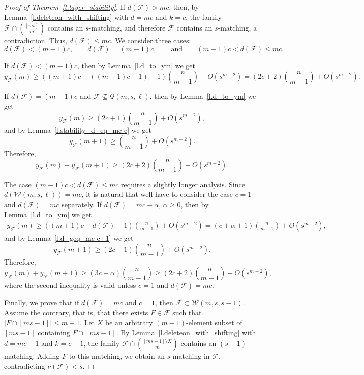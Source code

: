 \documentclass[12pt,a4paper]{article}
\newcommand{\m}{\mathcal}
\begin{document}
\begin{proof}[Proof of Theorem~\ref{t.layer_stability}]
If $d(\mathcal{F}) > mc$, then, by Lemma~\ref{l.deleteon_with_shifting} with $d=mc$ and $k=c$, the family $\mathcal{F} \cap {[ms] \choose m}$ contains an $s$-matching, and therefore $\mathcal{F}$ contains an $s$-matching, a contradiction. Thus, $d(\m F)\le mc.$ We consider three cases:
\[
d(\mathcal{F}) < (m-1)c,\qquad d(\mathcal{F}) = (m-1)c,\qquad \text{and} \qquad (m-1)c < d(\mathcal{F}) \leq mc.
\]

If $d(\mathcal{F}) < (m-1)c$, then by Lemma~\ref{l.d_to_ym} we get
\[
y_{\mathcal{F}}(m) \geq ((m+1)c-((m-1)c-1)+1){n \choose m - 1} + O(s^{m - 2}) = (2c+2){n \choose m - 1} + O(s^{m - 2}).
\]

If $d(\mathcal{F}) = (m-1)c$ and $\mathcal{F} \nsubseteq \mathcal{Q}(m,s,\ell)$, then by Lemma~\ref{l.d_to_ym} we get
\[
y_{\mathcal{F}}(m) \geq (2c+1){n \choose m - 1} + O(s^{m - 2}),
\]
and by Lemma~\ref{l.stability_d_eq_mc-c} we get
\[
y_{\mathcal{F}}(m+1) \geq {n \choose m - 1} + O(s^{m-2}).
\]
Therefore,
\[
y_{\mathcal{F}}(m) + y_{\mathcal{F}}(m + 1) \geq (2c+2){n \choose m - 1} + O(s^{m - 2}).
\]

The case $(m-1)c < d(\mathcal{F}) \leq mc$ requires a slightly longer analysis. Since $d(\mathcal{W}(m, s, \ell)) = mc$, it is natural that well have to consider  the case $c = 1$ and $d(\mathcal{F}) = mc$ separately. 
If $d(\mathcal{F}) = mc-\alpha$, $\alpha\ge 0$, then by Lemma~\ref{l.d_to_ym} we get
{\small \begin{align} \label{eq:tmp1}
    y_{\mathcal{F}}(m) \geq ((m+1)c-d(\m F)+1){n \choose m - 1} + O(s^{m - 2}) = (c+\alpha+1){n \choose m - 1} + O(s^{m - 2}),
\end{align}}
and by Lemma~\ref{l.d_geq_mc-c+1} we get
\[
y_{\mathcal{F}}(m+1) \geq (2c-1){n \choose m - 1} + O(s^{m-2}).
\]
Therefore,
\[
    y_{\mathcal{F}}(m) + y_{\mathcal{F}}(m + 1) \geq (3c+\alpha){n \choose m - 1}\ge (2c+2){n \choose m - 1} + O(s^{m - 2}),
\]
where the second inequality is valid unless $c = 1$ and $d(\mathcal{F}) = mc$.

Finally, we prove that if $d(\mathcal{F}) = mc$ and $c=1$, then $\mathcal{F} \subset \mathcal{W}(m, s, s-1)$. Assume the contrary, that is, that there exists $F \in \mathcal{F}$ such that $|F \cap [ms - 1]| \leq m - 1$. Let $X$ be an arbitrary $(m-1)$-element subset of $[ms - 1]$ containing $F \cap [ms - 1]$. By Lemma~\ref{l.deleteon_with_shifting} with $d = mc - 1$ and $k = c - 1$, the family $\mathcal{F}\cap {[ms - 1] \setminus X \choose m}$ contains an $(s-1)$-matching. Adding $F$ to this matching, we obtain an $s$-matching in $\mathcal{F}$, contradicting $\nu(\mathcal{F}) < s$.
\end{proof}
\end{document}
